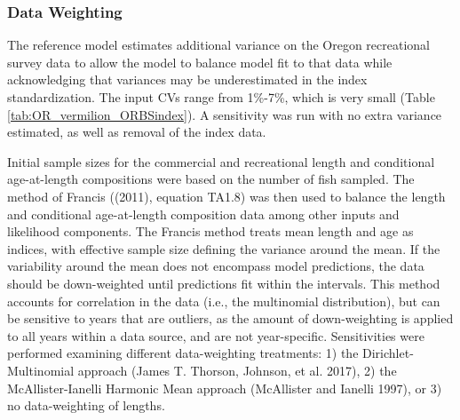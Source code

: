 \documentclass[11pt,
  english,
  a4paper,
]{article}
\begin{document}

\hypertarget{data-weighting}{%
\subsubsection{Data Weighting}\label{data-weighting}}

\leavevmode\tagmcend\tagstructend


The reference model estimates additional variance on the Oregon recreational survey data to allow the model to balance model fit to that data while acknowledging that variances may be underestimated in the index standardization. The input CVs range from 1\%-7\%, which is very small (Table \ref{tab:OR_vermilion_ORBSindex}). A sensitivity was run with no extra variance estimated, as well as removal of the index data.

\leavevmode\tagmcend\tagstructend\par


Initial sample sizes for the commercial and recreational length and conditional age-at-length compositions were based on the number of fish sampled. The method of Francis ({(2011)\leavevmode\tagmcend\tagstructend}, equation TA1.8) was then used to balance the length and conditional age-at-length composition data among other inputs and likelihood components. The Francis method treats mean length and age as indices, with effective sample size defining the variance around the mean. If the variability around the mean does not encompass model predictions, the data should be down-weighted until predictions fit within the intervals. This method accounts for correlation in the data (i.e., the multinomial distribution), but can be sensitive to years that are outliers, as the amount of down-weighting is applied to all years within a data source, and are not year-specific. Sensitivities were performed examining different data-weighting treatments: 1) the Dirichlet-Multinomial approach {(James T. Thorson, Johnson, et al. 2017)\leavevmode\tagmcend\tagstructend}, 2) the McAllister-Ianelli Harmonic Mean approach {(McAllister and Ianelli 1997)\leavevmode\tagmcend\tagstructend}, or 3) no data-weighting of lengths.
\end{document}
